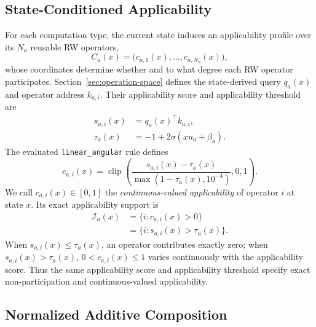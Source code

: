 \documentclass{article}
\begin{document}
\subsection{State-Conditioned Applicability}
\label{sec:applicability}

For each computation type, the current state induces an applicability profile
over its \(N_a\) reusable RW operators,
\begin{equation}
C_a(x)=\big(c_{a,1}(x),\ldots,c_{a,N_a}(x)\big),
\label{eq:applicability_profile}
\end{equation}
whose coordinates determine whether and to what degree each RW operator
participates. Section~\ref{sec:operation-space} defines the state-derived query
\(q_a(x)\) and operator address \(k_{a,i}\). Their applicability score and
applicability threshold are
\begin{align}
s_{a,i}(x)&=q_a(x)^\top k_{a,i},\\
\tau_a(x)&=-1+2\sigma\!\left(xu_a+\beta_a\right).
\label{eq:applicability_score_threshold}
\end{align}
The evaluated \texttt{linear\_angular} rule defines
\begin{equation}
c_{a,i}(x)=
\operatorname{clip}\!\left(
\frac{s_{a,i}(x)-\tau_a(x)}
{\max(1-\tau_a(x),10^{-4})},0,1\right).
\label{eq:applicability}
\end{equation}
We call \(c_{a,i}(x)\in[0,1]\) the \emph{continuous-valued applicability}
of operator \(i\) at state \(x\). Its exact applicability support is
\begin{equation}
\begin{aligned}
\mathcal{I}_a(x)
&=\{i:c_{a,i}(x)>0\}\\
&=\{i:s_{a,i}(x)>\tau_a(x)\}.
\end{aligned}
\label{eq:applicable_support}
\end{equation}
When \(s_{a,i}(x)\leq\tau_a(x)\), an operator contributes exactly zero; when
\(s_{a,i}(x)>\tau_a(x)\), \(0<c_{a,i}(x)\leq1\) varies continuously with the
applicability score. Thus the same applicability score and applicability
threshold specify exact non-participation and continuous-valued applicability.

\subsection{Normalized Additive Composition}
\label{sec:operator-composition}
\end{document}
